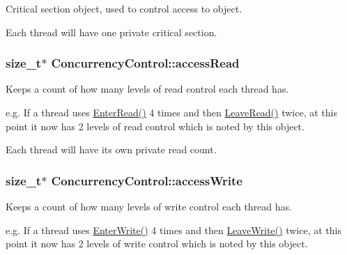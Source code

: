 Critical section object, used to control access to object. 

Each thread will have one private critical section. \hypertarget{class_concurrency_control_af07ace0cc51f0411ac09198e106a1123}{
\subsubsection[{accessRead}]{\setlength{\rightskip}{0pt plus 5cm}size\_\-t$\ast$ {\bf ConcurrencyControl::accessRead}}}
\label{class_concurrency_control_af07ace0cc51f0411ac09198e106a1123}


Keeps a count of how many levels of read control each thread has. 

e.g. If a thread uses \hyperlink{class_concurrency_control_aa2d6142d40a726d64148965aa9bd13fe}{EnterRead()} 4 times and then \hyperlink{class_concurrency_control_a98d2523a22ecac7c03e5b10e431d613d}{LeaveRead()} twice, at this point it now has 2 levels of read control which is noted by this object.\par
\par


Each thread will have its own private read count. \hypertarget{class_concurrency_control_ab0de7910c0fb51c3843f65e8cd40ae7c}{
\subsubsection[{accessWrite}]{\setlength{\rightskip}{0pt plus 5cm}size\_\-t$\ast$ {\bf ConcurrencyControl::accessWrite}}}
\label{class_concurrency_control_ab0de7910c0fb51c3843f65e8cd40ae7c}


Keeps a count of how many levels of write control each thread has. 

e.g. If a thread uses \hyperlink{class_concurrency_control_aadc7743380ba3da2385fd052de30f144}{EnterWrite()} 4 times and then \hyperlink{class_concurrency_control_a1b495ca39efffd3194c771b8c83931cd}{LeaveWrite()} twice, at this point it now has 2 levels of write control which is noted by this object.\par
\par


